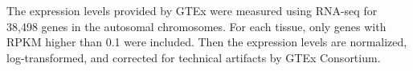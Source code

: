 \documentclass[aap,authoryear, preprint]{imsart}
\numberwithin{equation}{section}
\theoremstyle{plain}
\begin{document}
The expression levels provided by GTEx were measured using RNA-seq for 38,498 genes in the autosomal chromosomes. For each tissue, only genes with RPKM higher than 0.1 were included. Then the expression levels are normalized, log-transformed, and corrected for technical artifacts by GTEx Consortium. 
\end{document}
